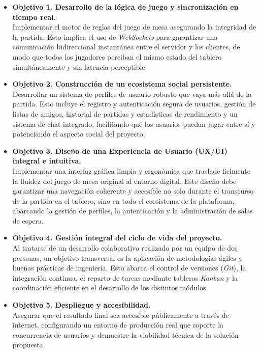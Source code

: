\begin{itemize}
    \item\textbf{Objetivo 1. Desarrollo de la lógica de juego y sincronización en tiempo real.} \\
    Implementar el motor de reglas del juego de mesa asegurando la integridad de la partida. Esto implica el uso de \textit{WebSockets} para garantizar una comunicación bidireccional instantánea entre el servidor y los clientes, de modo que todos los jugadores perciban el mismo estado del tablero simultáneamente y sin latencia perceptible.

    \item \textbf{Objetivo 2. Construcción de un ecosistema social persistente.} \\
    Desarrollar un sistema de perfiles de usuario robusto que vaya más allá de la partida. Esto incluye el registro y autenticación segura de usuarios, gestión de listas de amigos, historial de partidas y estadísticas de rendimiento y un sistema de chat integrado, facilitando que los usuarios puedan jugar entre sí y potenciando el aspecto social del proyecto.

    \item \textbf{Objetivo 3. Diseño de una Experiencia de Usuario (UX/UI) integral e intuitiva.} \\
    Implementar una interfaz gráfica limpia y ergonómica que traslade fielmente la fluidez del juego de mesa original al entorno digital. Este diseño debe garantizar una navegación coherente y accesible no solo durante el transcurso de la partida en el tablero, sino en todo el ecosistema de la plataforma, abarcando la gestión de perfiles, la autenticación y la administración de salas de espera.

    \item \textbf{Objetivo 4. Gestión integral del ciclo de vida del proyecto.} \\
    Al tratarse de un desarrollo colaborativo realizado por un equipo de dos personas, un objetivo transversal es la aplicación de metodologías ágiles y buenas prácticas de ingeniería. Esto abarca el control de versiones (\textit{Git}), la integración continua, el reparto de tareas mediante tableros \textit{Kanban} y la coordinación eficiente en el desarrollo de los distintos módulos.

    \item \textbf{Objetivo 5. Despliegue y accesibilidad.} \\
    Asegurar que el resultado final sea accesible públicamente a través de internet, configurando un entorno de producción real que soporte la concurrencia de usuarios y demuestre la viabilidad técnica de la solución propuesta.
\end{itemize}